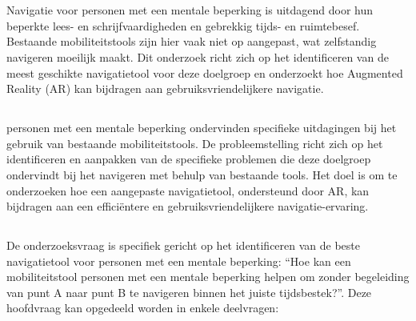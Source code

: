 \chapter{}%
\label{ch:inleiding}
Navigatie voor personen met een mentale beperking is uitdagend door hun beperkte lees- en schrijfvaardigheden en gebrekkig tijds- en ruimtebesef. Bestaande mobiliteitstools zijn hier vaak niet op aangepast, wat zelfstandig navigeren moeilijk maakt. Dit onderzoek richt zich op het identificeren van de meest geschikte navigatietool voor deze doelgroep en onderzoekt hoe Augmented Reality (AR) kan bijdragen aan gebruiksvriendelijkere navigatie.

\section{}%
\label{sec:probleemstelling}

personen met een mentale beperking ondervinden specifieke uitdagingen bij het gebruik van bestaande mobiliteitstools. De probleemstelling richt zich op het identificeren en aanpakken van de specifieke problemen die deze doelgroep ondervindt bij het navigeren met behulp van bestaande tools. Het doel is om te onderzoeken hoe een aangepaste navigatietool, ondersteund door AR, kan bijdragen aan een efficiëntere en gebruiksvriendelijkere navigatie-ervaring.

\section{}%
\label{sec:onderzoeksvraag}

De onderzoeksvraag is specifiek gericht op het identificeren van de beste navigatietool voor personen met een mentale beperking: ``Hoe kan een mobiliteitstool personen met een mentale beperking helpen om zonder begeleiding van punt A naar punt B te navigeren binnen het juiste tijdsbestek?''. Deze hoofdvraag kan opgedeeld worden in enkele deelvragen:


